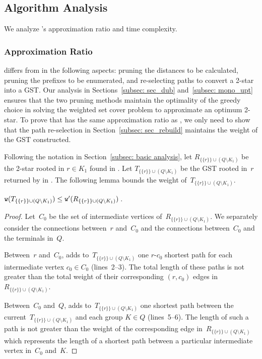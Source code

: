 \subsection{Algorithm Analysis}
\label{subsec: algo_ana}

We analyze \Improved's approximation ratio and time complexity.

\subsubsection{Approximation Ratio}
\Improved differs from \Basic in the following aspects: pruning the distances to be calculated, pruning the prefixes to be enumerated, and re-selecting paths to convert a 2-star into a GST. Our analysis in Sections~\ref{subsec: sec_dub} and~\ref{subsec: mono_upt} ensures that the two pruning methods maintain the optimality of the greedy choice in solving the weighted set cover problem to approximate an optimum 2-star. To prove that \Improved has the same approximation ratio as \Basic, we only need to show that the path re-selection in Section~\ref{subsec: sec_rebuild} maintains the weight of the GST constructed.

Following the notation in Section~\ref{subsec: basic analysis}, let $R_{\{\{r\}\}\cup(Q \setminus K_1)}$ be the 2-star rooted in $r \in K_1$ found in \Improved. Let $T_{\{\{r\}\}\cup (Q \setminus K_1)}$ be the GST rooted in~$r$ returned by \ConstructTree in \Improved. The following lemma bounds the weight of~$T_{\{\{r\}\}\cup (Q \setminus K_1)}$.

\begin{lemma}
    \label{lem: rebuildtree}
    $\mathtt{w}(T_{\{\{r\}\}\cup (Q \setminus K_1)}) \leq \mathtt{w}'(R_{\{\{r\}\}\cup(Q \setminus K_1)})$\,.
\end{lemma}
\begin{proof}
    Let~$C_0$ be the set of intermediate vertices of~$R_{\{\{r\}\}\cup(Q \setminus K_1)}$. We separately consider the connections between~$r$ and~$C_0$ and the connections between~$C_0$ and the terminals in~$Q$.

    Between~$r$ and~$C_0$, \ConstructTree adds to~$T_{\{\{r\}\}\cup (Q \setminus K_1)}$ one $r$-$c_0$ shortest path for each intermediate vertex $c_0 \in C_0$ (lines~2--3). The total length of these paths is not greater than the total weight of their corresponding $(r,c_0)$ edges in~$R_{\{\{r\}\}\cup(Q \setminus K_1)}$.

    Between~$C_0$ and~$Q$, \ConstructTree adds to~$T_{\{\{r\}\}\cup (Q \setminus K_1)}$ one shortest path between the current~$T_{\{\{r\}\}\cup (Q \setminus K_1)}$ and each group $K \in Q$ (lines~5--6). The length of such a path is not greater than the weight of the corresponding edge in~$R_{\{\{r\}\}\cup(Q \setminus K_1)}$ which represents the length of a shortest path between a particular intermediate vertex in~$C_0$ and~$K$.
\end{proof}


